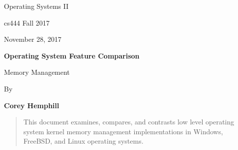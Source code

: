 \documentclass[letterpaper,10pt,draftclsnofoot,onecolumn]{IEEEtran}
\def \Author{Corey Hemphill}
\def \Title{Operating System Feature Comparison}
\def \Subtitle{Memory Management}
\def \Term{cs444 Fall 2017}
\def \DueDate{November 28, 2017}
\def \DocType{
	Operating Systems II
}
\begin{document}
\begin{titlepage}
    \begin{singlespace}
        \hfill  
        \par\vspace{.2in}
        \centering
        \scshape{
            \huge  \DocType \par
           	\huge \Term \par
            {\large \DueDate}\par
            \vspace{.5in}
            \textbf{\Huge \Title}\par
            {\large \Subtitle}\par
            \vspace{.5in}
           
            {\large By }\par
           	\textbf{\Author}\par
   
            \vspace{5pt}
            }
            \vspace{120pt}
        
        \begin{abstract}
        This document examines, compares, and contrasts low level operating system kernel memory management implementations in Windows, FreeBSD, and Linux operating systems.
        \end{abstract} 
        
    \end{singlespace}
\end{titlepage}
\newpage
\end{document}
